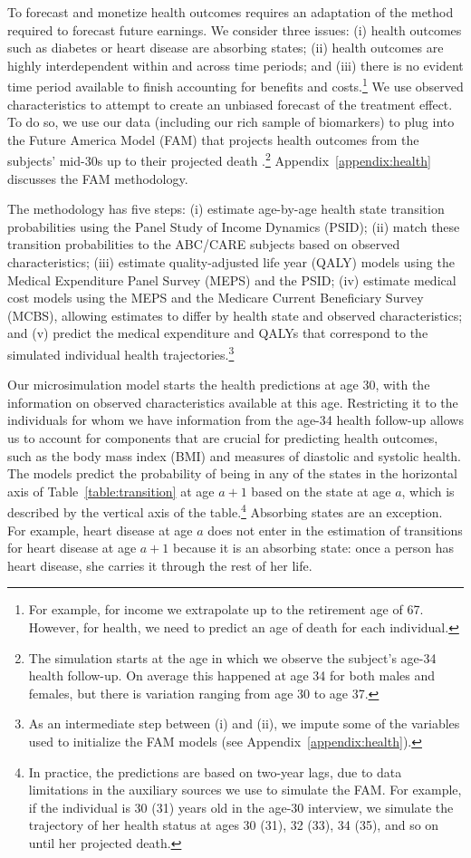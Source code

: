 To forecast and monetize health outcomes requires an adaptation of the method required to forecast future earnings. We consider three issues: (i) health outcomes such as diabetes or heart disease are absorbing states; (ii) health outcomes are highly interdependent within and across time periods; and (iii) there is no evident time period available to finish accounting for benefits and costs.\footnote{For example, for income we extrapolate up to the retirement age of 67. However, for health, we need to predict an age of death for each individual.} We use observed characteristics to attempt to create an unbiased forecast of the treatment effect. To do so, we use our data (including our rich sample of biomarkers) to plug into the Future America Model (FAM) that projects health outcomes from the subjects' mid-30s up to their projected death \citep{Goldman_etal_2015_Future-Elderly-Model-Report}.\footnote{The simulation starts at the age in which we observe the subject's age-34 health follow-up. On average this happened at age 34 for both males and females, but there is variation ranging from age 30 to age 37.} Appendix~\ref{appendix:health} discusses the FAM methodology.

The methodology has five steps: (i) estimate age-by-age health state transition probabilities using the Panel Study of Income Dynamics (PSID); (ii) match these transition probabilities to the ABC/CARE subjects based on observed characteristics; (iii) estimate quality-adjusted life year (QALY) models using the Medical Expenditure Panel Survey (MEPS) and the PSID; (iv) estimate medical cost models using the MEPS and the Medicare Current Beneficiary Survey (MCBS), allowing estimates to differ by health state and observed characteristics; and (v) predict the medical expenditure and QALYs that correspond to the simulated individual health trajectories.\footnote{As an intermediate step between (i) and (ii), we impute some of the variables used to initialize the FAM models (see Appendix~\ref{appendix:health}).}

Our microsimulation model starts the health predictions at age 30, with the information on observed characteristics available at this age. Restricting it to the individuals for whom we have information from the age-34 health follow-up allows us to account for components that are crucial for predicting health outcomes, such as the body mass index (BMI) and measures of diastolic and systolic health. The models predict the probability of being in any of the states in the horizontal axis of Table~\ref{table:transition} at age $a+1$ based on the state at age $a$, which is described by the vertical axis of the table.\footnote{In practice, the predictions are based on two-year lags, due to data limitations in the auxiliary sources we use to simulate the FAM. For example, if the individual is 30 (31) years old in the age-30 interview, we simulate the trajectory of her health status at ages 30 (31), 32 (33), 34 (35), and so on until her projected death.} Absorbing states are an exception. For example, heart disease at age $a$ does not enter in the estimation of transitions for heart disease at age $a+1$ because it is an absorbing state: once a person has heart disease, she carries it through the rest of her life.

